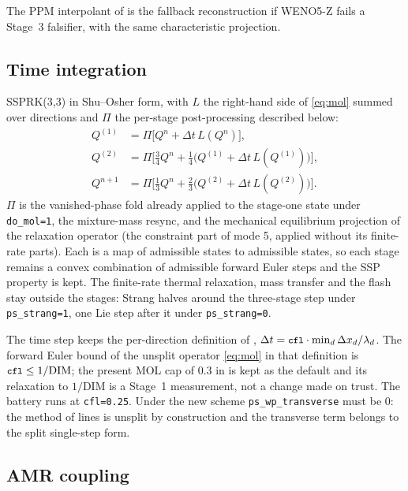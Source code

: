 \documentclass[11pt,a4paper]{article}
\newcommand{\code}[1]{\texttt{\small #1}}
\newcommand{\Dt}{\Delta t}
\newcommand{\Dx}{\Delta x}
\begin{document}
The PPM interpolant of  is the fallback reconstruction
if WENO5-Z fails a Stage~3 falsifier, with the same characteristic
projection.

\subsection{Time integration}

SSPRK(3,3) in Shu--Osher form, with $L$ the right-hand side of
\eqref{eq:mol} summed over directions and $\Pi$ the per-stage
post-processing described below:
\begin{align}
Q^{(1)} &= \Pi\big[Q^n + \Dt\,L(Q^n)\big], \\
Q^{(2)} &= \Pi\big[\tfrac34 Q^n + \tfrac14\big(Q^{(1)} + \Dt\,L(Q^{(1)})\big)\big], \\
Q^{n+1} &= \Pi\big[\tfrac13 Q^n + \tfrac23\big(Q^{(2)} + \Dt\,L(Q^{(2)})\big)\big].
\end{align}
$\Pi$ is the vanished-phase fold already applied to the stage-one state
under \code{do\_mol=1}, the mixture-mass resync, and the mechanical
equilibrium projection of the relaxation operator (the constraint part of
mode 5, applied without its finite-rate parts).  Each is a map of
admissible states to admissible states, so each stage remains a convex
combination of admissible forward Euler steps and the SSP property is
kept.  The finite-rate thermal relaxation, mass transfer and the flash
stay outside the stages: Strang halves around the three-stage step under
\code{ps\_strang=1}, one Lie step after it under \code{ps\_strang=0}.

The time step keeps the per-direction definition of ,
$\Dt = \code{cfl}\cdot\min_d \Dx_d/\lambda_d$.  The forward Euler bound of
the unsplit operator \eqref{eq:mol} in that definition is
$\code{cfl}\le 1/\mathrm{DIM}$; the present MOL cap of 0.3 in
 is kept as the default and its relaxation to $1/\mathrm{DIM}$
is a Stage~1 measurement, not a change made on trust.  The battery runs
at \code{cfl=0.25}.  Under the new scheme \code{ps\_wp\_transverse} must be
0: the method of lines is unsplit by construction and the transverse term
belongs to the split single-step form.

\subsection{AMR coupling}
\end{document}
